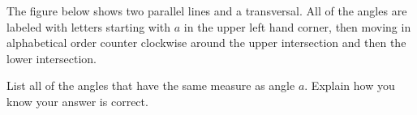 \documentclass[nooutcomes,noauthor]{ximera}
\begin{document}
\begin{problem}
The figure below shows two parallel lines and a transversal. All of the angles are labeled with letters starting with $a$ in the upper left hand corner, then moving in alphabetical order counter clockwise around the upper intersection and then the lower intersection.
\begin{image}  \end{image}

List all of the angles that have the same measure as angle $a$. Explain how you know your answer is correct.


\end{problem}

\newpage
\end{document}
